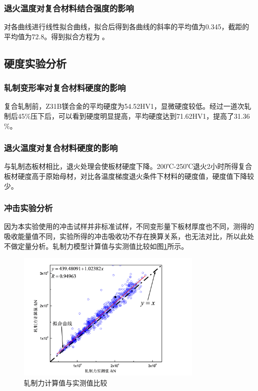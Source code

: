 		\subsubsection{退火温度对复合材料结合强度的影响}
		对各曲线进行线性拟合曲线，拟合后得到各曲线的斜率的平均值为0.345，截距的平均值为72.8。得到拟合方程为 。\par
	\subsection{硬度实验分析}
		
		\subsubsection{轧制变形率对复合材料硬度的影响}
	  
		复合轧制前，Z31B镁合金的平均硬度为54.52HV1，显微硬度较低。经过一道次轧制后45$\%$压下后，可以看到硬度明显提高，平均硬度达到71.62HV1，提高了31.36$\%$。\par
	  	\subsubsection{退火温度对复合材料硬度的影响}
	  
		与轧制态板材相比，退火处理会使板材硬度下降。200℃-250℃退火2小时所得复合板材硬度高于原始母材，对比各温度梯度退火条件下材料的硬度值，硬度值下降较少。\par
		\subsubsection{冲击实验分析}
		
		因为本实验使用的冲击试样并非标准试样，不同变形量下板材厚度也不同，测得的吸收能量值不同，实验所得的冲击吸收功不存在换算关系，也无法对比，所以此处不做定量分析。轧制力模型计算值与实测值比较如图\ref{fig:zhazhilijisuan}所示。\par
		\begin{figure}[H]
			\vspace{-1em}
			\centering
			\includegraphics[width=0.8\textwidth]{images/zhazhilijisuan}
			\caption{轧制力计算值与实测值比较}
			\label{fig:zhazhilijisuan}
			\vspace{-1.5em}
		\end{figure}
